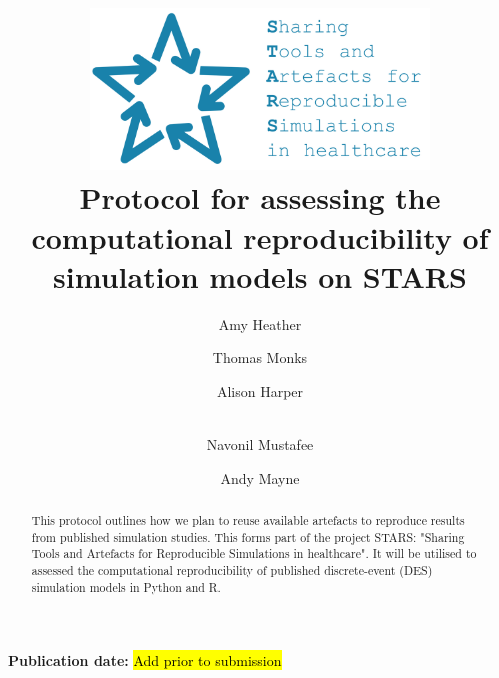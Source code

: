 \title{
    \vspace{-1cm}
    \includegraphics[width=9cm]{images/stars_logo_blue_text.png}\\[1cm]
    \textbf{Protocol for assessing the computational reproducibility of simulation models on STARS}
}

\author[1]{ Amy Heather}
\author[1]{ Thomas Monks}
\author[2]{ Alison Harper}
\author[2]{\\  Navonil Mustafee}
\author[3]{ Andy Mayne}


\date{}

\maketitle

\textbf{Publication date:} \hl{Add prior to submission}

\vspace{0.5cm}

\begin{shaded}
    \begin{abstract}
        This protocol outlines how we plan to reuse available artefacts to reproduce results from published simulation studies. This forms part of the project STARS: "Sharing Tools and Artefacts for Reproducible Simulations in healthcare". It will be utilised to assessed the computational reproducibility of published discrete-event (DES) simulation models in Python and R.
    \end{abstract}
\end{shaded}

